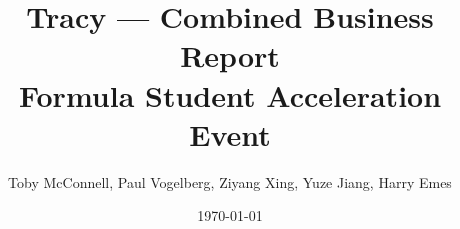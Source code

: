 \documentclass[11pt, a4paper]{report}
\title{Tracy --- Combined Business Report \\ Formula Student Acceleration Event}
\author{Toby McConnell, Paul Vogelberg, Ziyang Xing, Yuze Jiang, Harry Emes}
\date{\today}
\numberwithin{equation}{section}
\begin{document}

\maketitle
\newpage

\setcounter{page}{1}

\tableofcontents
\newpage

\begin{refsection}
\graphicspath{{../TobyMcConnell/Business/}}

\end{refsection}

\begin{refsection}
\graphicspath{{../PaulVogelberg/Business/}}

\printbibliography
\end{refsection}

\begin{refsection}
\graphicspath{{../MichaelZiyangXing/}}

\printbibliography
\end{refsection}

\begin{refsection}
\graphicspath{{yuze_assets/Business/}}

\end{refsection}



\begin{refsection}
\graphicspath{{../HarryEmes/Business/figures/}{../HarryEmes/Business/}}

\end{refsection}
\end{document}
